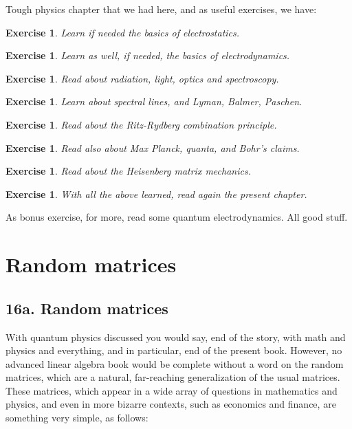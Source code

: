 \documentclass[12pt]{amsbook}
\newtheorem{exercise}[theorem]{Exercise}
\begin{document}
Tough physics chapter that we had here, and as useful exercises, we have:

\begin{exercise}
Learn if needed the basics of electrostatics.
\end{exercise}

\begin{exercise}
Learn as well, if needed, the basics of electrodynamics.
\end{exercise}

\begin{exercise}
Read about radiation, light, optics and spectroscopy.
\end{exercise}

\begin{exercise}
Learn about spectral lines, and Lyman, Balmer, Paschen.
\end{exercise}

\begin{exercise}
Read about the Ritz-Rydberg combination principle.
\end{exercise}

\begin{exercise}
Read also about Max Planck, quanta, and Bohr's claims.
\end{exercise}

\begin{exercise}
Read about the Heisenberg matrix mechanics.
\end{exercise}

\begin{exercise}
With all the above learned, read again the present chapter.
\end{exercise}

As bonus exercise, for more, read some quantum electrodynamics. All good stuff.

\chapter{Random matrices}

\section*{16a. Random matrices}

With quantum physics discussed you would say, end of the story, with math and physics and everything, and in particular, end of the present book. However, no advanced linear algebra book would be complete without a word on the random matrices, which are a natural, far-reaching generalization of the usual matrices. These matrices, which appear in a wide array of questions in mathematics and physics, and even in more bizarre contexts, such as economics and finance, are something very simple, as follows:
\end{document}
